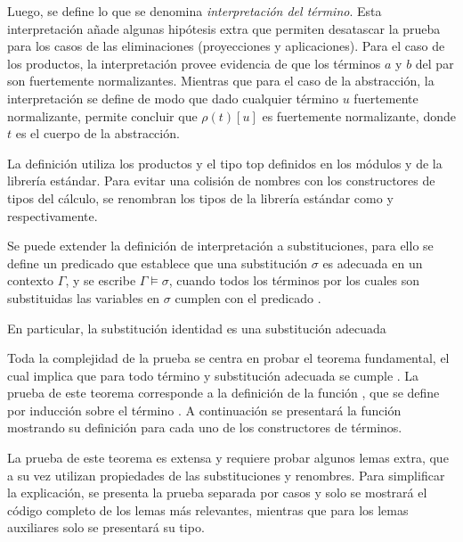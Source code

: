 Luego, se define lo que se denomina \textit{interpretación del término}.
Esta interpretación añade algunas hipótesis extra que permiten desatascar la prueba para los casos de las eliminaciones (proyecciones y aplicaciones).
Para el caso de los productos, la interpretación provee evidencia de que los términos $a$ y $b$ del par son fuertemente normalizantes.
Mientras que para el caso de la abstracción, la interpretación se define de modo que dado cualquier término $u$ fuertemente normalizante, permite concluir que $\rho (t) [u]$ es fuertemente normalizante, donde $t$ es el cuerpo de la abstracción.


La definición utiliza los productos \func{$\_\times\_$} y el tipo top \type{$\top$} definidos en los módulos  y  de la librería estándar.
Para evitar una colisión de nombres con los constructores de tipos del cálculo, se renombran los tipos de la librería estándar como \func{$\_\otimes\_$} y  respectivamente.

Se puede extender la definición de interpretación a substituciones, para ello se define un predicado que establece que una substitución $\sigma$ es adecuada en un contexto $\Gamma$, y se escribe $\Gamma \vDash \sigma$, cuando todos los términos por los cuales son substituidas las variables en $\sigma$ cumplen con el predicado \snstar.


En particular, la substitución identidad  es una substitución adecuada


Toda la complejidad de la prueba se centra en probar el teorema fundamental, el cual implica que para todo término  y substitución adecuada  se cumple
\snstar{}.
La prueba de este teorema corresponde a la definición de la función , que se define por inducción sobre el término .
A continuación se presentará la función mostrando su definición para cada uno de los constructores de términos.


La prueba de este teorema es extensa y requiere probar algunos lemas extra, que a su vez utilizan propiedades de las substituciones y renombres.
Para simplificar la explicación, se presenta la prueba separada por casos y solo se mostrará el código completo de los lemas más relevantes, mientras que para los lemas auxiliares solo se presentará su tipo.

